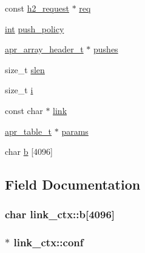 \begin{DoxyCompactItemize}
\item 
const \hyperlink{structh2__request}{h2\+\_\+request} $\ast$ \hyperlink{structlink__ctx_aa929974742a5e92a97982b19bfa04511}{req}
\item 
\hyperlink{pcre_8txt_a42dfa4ff673c82d8efe7144098fbc198}{int} \hyperlink{structlink__ctx_a00704e320fb48c1513cb39efcdd33628}{push\+\_\+policy}
\item 
\hyperlink{structapr__array__header__t}{apr\+\_\+array\+\_\+header\+\_\+t} $\ast$ \hyperlink{structlink__ctx_a27a1b354d180785b5517dba36444647f}{pushes}
\item 
size\+\_\+t \hyperlink{structlink__ctx_aa44ed2cc522848dcb00c52f402c8cf60}{slen}
\item 
size\+\_\+t \hyperlink{structlink__ctx_a646bfa0e3aac2fa79384bf1fe9dd762b}{i}
\item 
const char $\ast$ \hyperlink{structlink__ctx_a43c3b62fa3617f70fd7a5b12b05b1f2b}{link}
\item 
\hyperlink{structapr__table__t}{apr\+\_\+table\+\_\+t} $\ast$ \hyperlink{structlink__ctx_a5fb7762df882bdb17713cf7a5db2ce26}{params}
\item 
char \hyperlink{structlink__ctx_a81a8f44d7ac051df16c640ccc2d9ee8c}{b} \mbox{[}4096\mbox{]}
\end{DoxyCompactItemize}


\subsection{Field Documentation}
\subsubsection[{\texorpdfstring{b}{b}}]{\setlength{\rightskip}{0pt plus 5cm}char link\+\_\+ctx\+::b\mbox{[}4096\mbox{]}}\hypertarget{structlink__ctx_a81a8f44d7ac051df16c640ccc2d9ee8c}{}\label{structlink__ctx_a81a8f44d7ac051df16c640ccc2d9ee8c}
\subsubsection[{\texorpdfstring{conf}{conf}}]{$\ast$ link\+\_\+ctx\+::conf}\hypertarget{structlink__ctx_a7dcc6d00cbd614a33b8c79a3815a3299}{}\label{structlink__ctx_a7dcc6d00cbd614a33b8c79a3815a3299}
